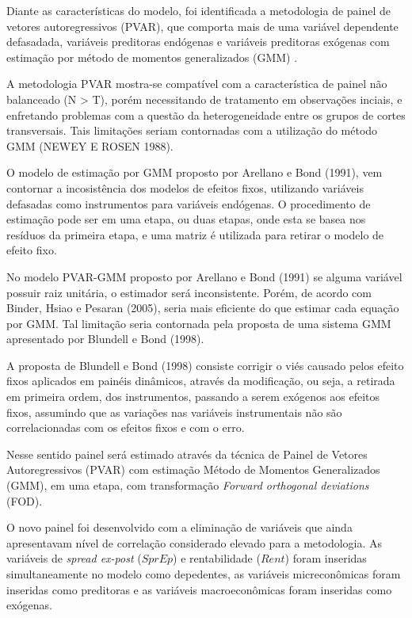 \documentclass[
  12pt,
  12pt,
  openright,
  oneside,
  a4paper,
  chapter=TITLE,
  section=TITLE,
  subsection=TITLE,
  subsubsection=TITLE,
  english,
  portugues,
  sumario=tradicional]{abntex2}
\begin{document}
Diante as características do modelo, foi identificada a metodologia de painel de vetores autoregressivos (PVAR), que comporta mais de uma variável dependente defasadada, variáveis preditoras endógenas e variáveis preditoras exógenas com estimação por método de momentos generalizados (GMM) .

A metodologia PVAR mostra-se compatível com a característica de painel não balanceado (N \textgreater{} T), porém necessitando de tratamento em observações inciais, e enfretando problemas com a questão da heterogeneidade entre os grupos de cortes transversais. Tais limitações seriam contornadas com a utilização do método GMM (\uppercase{Newey e Rosen} 1988).

O modelo de estimação por GMM proposto por Arellano e Bond (1991), vem contornar a incosistência dos modelos de efeitos fixos, utilizando variáveis defasadas como instrumentos para variáveis endógenas. O procedimento de estimação pode ser em uma etapa, ou duas etapas, onde esta se basea nos resíduos da primeira etapa, e uma matriz é utilizada para retirar o modelo de efeito fixo.

No modelo PVAR-GMM proposto por Arellano e Bond (1991) se alguma variável possuir raiz unitária, o estimador será inconsistente. Porém, de acordo com Binder, Hsiao e Pesaran (2005), seria mais eficiente do que estimar cada equação por GMM. Tal limitação seria contornada pela proposta de uma sistema GMM apresentado por Blundell e Bond (1998).

A proposta de Blundell e Bond (1998) consiste corrigir o viés causado pelos efeito fixos aplicados em painéis dinâmicos, através da modificação, ou seja, a retirada em primeira ordem, dos instrumentos, passando a serem exógenos aos efeitos fixos, assumindo que as variações nas variáveis instrumentais não são correlacionadas com os efeitos fixos e com o erro.

Nesse sentido painel será estimado através da técnica de Painel de Vetores Autoregressivos (PVAR) com estimação Método de Momentos Generalizados (GMM), em uma etapa, com transformação \emph{Forward orthogonal deviations} (FOD).

O novo painel foi desenvolvido com a eliminação de variáveis que ainda apresentavam nível de correlação considerado elevado para a metodologia. As variáveis de \emph{spread ex-post} (\(SprEp\)) e rentabilidade (\(Rent\)) foram inseridas simultaneamente no modelo como depedentes, as variáveis micreconômicas foram inseridas como preditoras e as variáveis macroeconômicas foram inseridas como exógenas.
\end{document}
